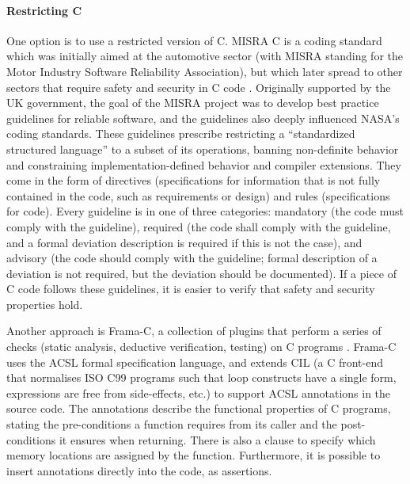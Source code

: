 \paragraph{Restricting C}
One option is to use a restricted version of C.
MISRA C is a coding standard which was initially aimed at the automotive sector (with MISRA standing for the Motor Industry Software Reliability Association), but which later spread to other sectors that require safety and security in C code \cite{bagnara2018}.
Originally supported by the UK government, the goal of the MISRA project was to develop best practice guidelines for reliable software, and the guidelines also deeply influenced NASA's coding standards.
These guidelines prescribe restricting a ``standardized structured language'' to a subset of its operations, banning non-definite behavior and constraining implementation-defined behavior and compiler extensions.
They come in the form of directives (specifications for information that is not fully contained in the code, such as requirements or design) and rules (specifications for code).
Every guideline is in one of three categories: mandatory (the code must comply with the guideline), required (the code shall comply with the guideline, and a formal deviation description is required if this is not the case), and advisory (the code should comply with the guideline; formal description of a deviation is not required, but the deviation should be documented).
If a piece of C code follows these guidelines, it is easier to verify that safety and security properties hold.

Another approach is Frama-C, a collection of plugins that perform a series of checks (static analysis, deductive verification, testing) on C programs \cite{cuoq2012}.
Frama-C uses the ACSL formal specification language, and extends CIL (a C front-end that normalises ISO C99 programs such that loop constructs have a single form, expressions are free from side-effects, etc.) to support ACSL annotations in the source code.
The annotations describe the functional properties of C programs, stating the pre-conditions a function requires from its caller and the post-conditions it ensures when returning.
There is also a clause to specify which memory locations are assigned by the function.
Furthermore, it is possible to insert annotations directly into the code, as assertions.


